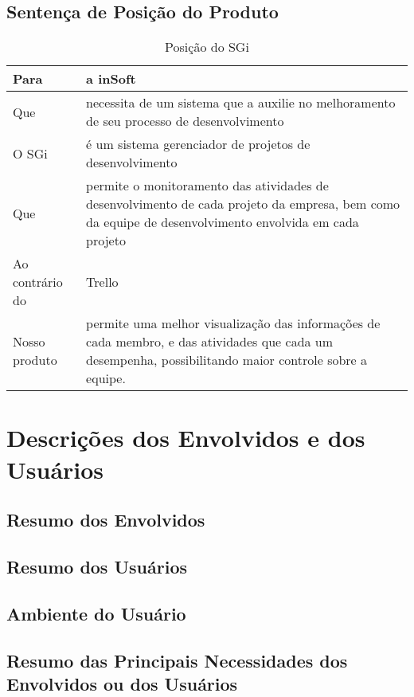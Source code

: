     \subsection{Sentença de Posição do Produto}

      \begin{table}[H]
        \centering
        \begin{tabular}{|>{\columncolor[HTML]{C0C0C0}}p{}|p{}|}
          \hline
          Para            &   a inSoft                                                \\ \hline
          Que             &   necessita de um sistema que a auxilie no melhoramento de seu processo de desenvolvimento
                                                                                       \\ \hline
          O SGi           &   é um sistema gerenciador de projetos de desenvolvimento  \\ \hline
          Que             &   permite o monitoramento das atividades de desenvolvimento de cada projeto da empresa, bem como da equipe de desenvolvimento envolvida em cada projeto                \\ \hline
          Ao contrário do &   Trello \\ \hline
          Nosso produto   &   permite uma melhor visualização das informações de cada membro, e das atividades que cada um desempenha, possibilitando maior controle sobre a equipe.                \\ \hline
        \end{tabular}
        \caption{Posição do SGi}
      \end{table}

  \section{Descrições dos Envolvidos e dos Usuários}
    \subsection{Resumo dos Envolvidos}
    \subsection{Resumo dos Usuários}
    \subsection{Ambiente do Usuário}
    \subsection{Resumo das Principais Necessidades dos Envolvidos ou dos Usuários}
